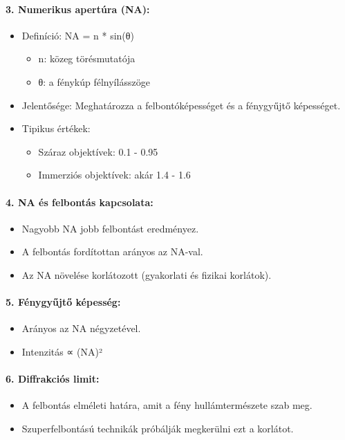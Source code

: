 \documentclass[a4paper,12pt]{article}
\begin{document}
\paragraph{3. Numerikus apertúra (NA):} \begin{itemize} \item Definíció: NA = n * sin(θ) \begin{itemize} \item n: közeg törésmutatója \item θ: a fénykúp félnyílásszöge \end{itemize} \item Jelentősége: Meghatározza a felbontóképességet és a fénygyűjtő képességet. \item Tipikus értékek: \begin{itemize} \item Száraz objektívek: 0.1 - 0.95 \item Immerziós objektívek: akár 1.4 - 1.6 \end{itemize} \end{itemize}

\paragraph{4. NA és felbontás kapcsolata:} \begin{itemize} \item Nagyobb NA jobb felbontást eredményez. \item A felbontás fordítottan arányos az NA-val. \item Az NA növelése korlátozott (gyakorlati és fizikai korlátok). \end{itemize}

\paragraph{5. Fénygyűjtő képesség:} \begin{itemize} \item Arányos az NA négyzetével. \item Intenzitás ∝ (NA)² \end{itemize}

\paragraph{6. Diffrakciós limit:} \begin{itemize} \item A felbontás elméleti határa, amit a fény hullámtermészete szab meg. \item Szuperfelbontású technikák próbálják megkerülni ezt a korlátot. \end{itemize}
\end{document}
